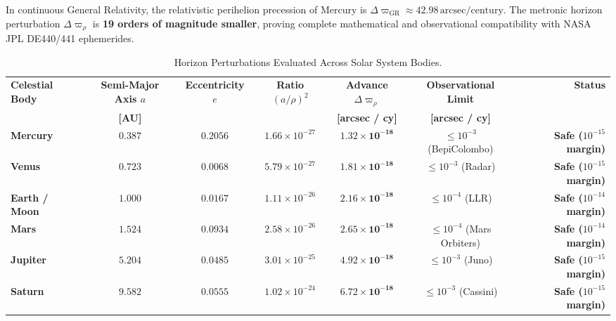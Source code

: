\documentclass[
    12pt,
    a4paper,
    headings=normal,
    twoside=false,
    open=any,
    parskip=half
]{scrbook}
\begin{document}
In continuous General Relativity, the relativistic perihelion precession of Mercury is $\Delta\varpi_{\text{GR}} \approx 42.98\,\text{arcsec/century}$. The metronic horizon perturbation $\Delta\varpi_\rho$ is \textbf{19 orders of magnitude smaller}, proving complete mathematical and observational compatibility with NASA JPL DE440/441 ephemerides.

\begin{table}[htbp]
\centering
\small
\caption{Horizon Perturbations Evaluated Across Solar System Bodies.}
\label{tab:appB_ephemeris_table}
\begin{adjustbox}{max width=\textwidth}
\begin{tabular}{lcccccr}\toprule
\textbf{Celestial Body} & \textbf{Semi-Major Axis $a$} & \textbf{Eccentricity $e$} & \textbf{Ratio $(a/\rho)^2$} & \textbf{Advance $\Delta\varpi_\rho$} & \textbf{Observational Limit} & \textbf{Status} \\
& \textbf{[AU]} & & & \textbf{[arcsec / cy]} & \textbf{[arcsec / cy]} & \\\midrule
\rowcolor{secondarycolor!8}
\textbf{Mercury} & $0.387$ & $0.2056$ & $1.66 \times 10^{-27}$ & $\mathbf{1.32 \times 10^{-18}}$ & $\le 10^{-3}$ (BepiColombo) & \textbf{Safe ($10^{-15}$ margin)} \\
\textbf{Venus} & $0.723$ & $0.0068$ & $5.79 \times 10^{-27}$ & $\mathbf{1.81 \times 10^{-18}}$ & $\le 10^{-3}$ (Radar) & \textbf{Safe ($10^{-15}$ margin)} \\
\rowcolor{secondarycolor!8}
\textbf{Earth / Moon} & $1.000$ & $0.0167$ & $1.11 \times 10^{-26}$ & $\mathbf{2.16 \times 10^{-18}}$ & $\le 10^{-4}$ (LLR) & \textbf{Safe ($10^{-14}$ margin)} \\
\textbf{Mars} & $1.524$ & $0.0934$ & $2.58 \times 10^{-26}$ & $\mathbf{2.65 \times 10^{-18}}$ & $\le 10^{-4}$ (Mars Orbiters) & \textbf{Safe ($10^{-14}$ margin)} \\
\rowcolor{secondarycolor!8}
\textbf{Jupiter} & $5.204$ & $0.0485$ & $3.01 \times 10^{-25}$ & $\mathbf{4.92 \times 10^{-18}}$ & $\le 10^{-3}$ (Juno) & \textbf{Safe ($10^{-15}$ margin)} \\
\textbf{Saturn} & $9.582$ & $0.0555$ & $1.02 \times 10^{-24}$ & $\mathbf{6.72 \times 10^{-18}}$ & $\le 10^{-3}$ (Cassini) & \textbf{Safe ($10^{-15}$ margin)} \\\bottomrule
\end{tabular}
\end{adjustbox}
\end{table}
\end{document}
